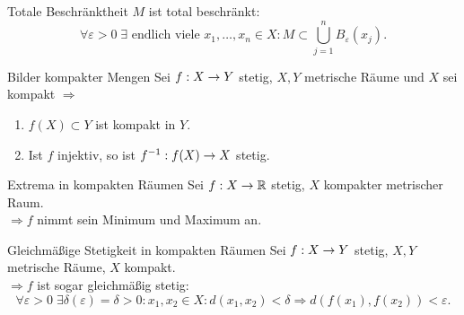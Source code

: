\documentclass[main.tex]{subfiles}
\begin{document}
\begin{karte}{Totale Beschränktheit}
    \(M\) ist total beschränkt: 
    \[ \forall \varepsilon > 0 \; 
    \exists \text{ endlich viele } x_1,\dots,x_n \in X:
    M \subset \bigcup_{j=1}^n B_\varepsilon(x_j). \]
\end{karte}

\begin{karte}{Bilder kompakter Mengen}
    Sei \( f : X \rightarrow Y \) stetig, \( X, Y \) metrische Räume
    und \(X\) sei kompakt
    \( \Rightarrow \)
    \begin{enumerate}
        \item \( f(X) \subset Y \) ist kompakt in \( Y \).
        \item Ist \(f\) injektiv, so ist \( f^{-1} : f(X) \rightarrow X \)
        stetig.
    \end{enumerate}
\end{karte}

\begin{karte}{Extrema in kompakten Räumen}
    Sei \( f : X \rightarrow \mathbb{R} \) stetig, \( X \) kompakter 
    metrischer Raum.\\
    \( \Rightarrow f \) nimmt sein Minimum und 
    Maximum an.
\end{karte}

\begin{karte}{Gleichmäßige Stetigkeit in kompakten Räumen}
    Sei \( f : X \rightarrow Y \) stetig, 
    \( X, Y \) metrische Räume, \(X\)
    kompakt. \\
    \( \Rightarrow f \) ist sogar gleichmäßig 
    stetig:
    \[ \forall \varepsilon > 0\; \exists 
    \delta(\varepsilon) = \delta > 0:
    x_1, x_2 \in X: d(x_1, x_2) < \delta
    \Rightarrow d(f(x_1), f(x_2)) < \varepsilon. \]
\end{karte}
\end{document}
